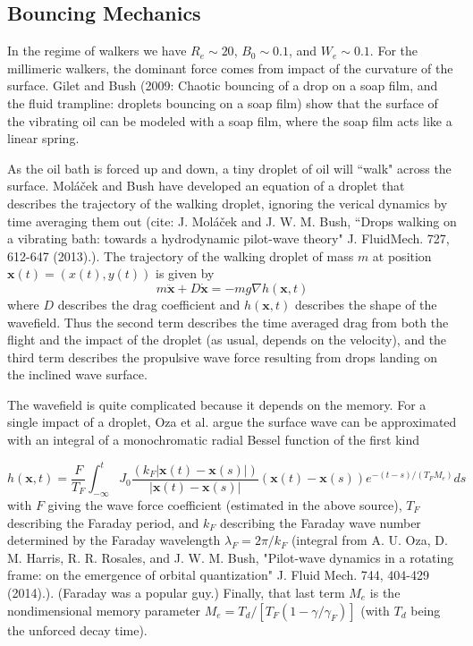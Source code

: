 \subsection{Bouncing Mechanics}
In the regime of walkers we have $R_e \sim 20$, $B_0 \sim 0.1$, and $W_e \sim 0.1$. For the millimeric walkers, the dominant force comes from impact of the curvature of the surface. Gilet and Bush (2009: Chaotic bouncing of a drop on a soap film, and the fluid trampline: droplets bouncing on a soap film) show that the surface of the vibrating oil can be modeled with a soap film, where the soap film acts like a linear spring. 

As the oil bath is forced up and down, a tiny droplet of oil will ``walk" across the surface. Mol\'{a}\v{c}ek and Bush have developed an equation of a droplet that describes the trajectory of the walking droplet, ignoring the verical dynamics by time averaging them out (cite: J. Mol\'{a}\v{c}ek and J. W. M. Bush, ``Drops walking on a vibrating bath: towards a hydrodynamic pilot-wave theory" J. FluidMech. 727, 612-647 (2013).). The trajectory of the walking droplet of mass $m$ at position $\textbf{x}(t) = (x(t),y(t))$ is given by
\begin{equation}
m \ddot{\textbf{x}} + D \dot{\textbf{x}} = -mg\nabla h(\textbf{x},t) 
\end{equation}
where $D$ describes the drag coefficient and $h(\textbf{x},t)$ describes the shape of the wavefield. Thus the second term describes the time averaged drag from both the flight and the impact of the droplet (as usual, depends on the velocity), and the third term describes the propulsive wave force resulting from drops landing on the inclined wave surface. 

The wavefield is quite complicated because it depends on the memory. For a single impact of a droplet, Oza et al. argue the surface wave can be approximated with an integral of a monochromatic radial Bessel function of the first kind

\begin{equation}
h(\textbf{x},t) = \frac{F}{T_F} \int_{-\infty}^{t} J_0 \frac{(k_F |\textbf{x}(t)-\textbf{x}(s)|)}{|\textbf{x}(t)-\textbf{x}(s)|} (\textbf{x}(t)-\textbf{x}(s))e^{-(t-s)/(T_F M_e)} ds
\end{equation}
with $F$ giving the wave force coefficient (estimated in the above source), $T_F$ describing the Faraday period, and $k_F$ describing the Faraday wave number determined by the Faraday wavelength $\lambda_F = 2π/k_F$ (integral from A. U. Oza, D. M. Harris, R. R. Rosales, and J. W. M. Bush, "Pilot-wave dynamics in a rotating frame: on the emergence of orbital quantization" J. Fluid Mech. 744, 404-429 (2014).). (Faraday was a popular guy.) Finally, that last term $M_e$ is the nondimensional memory parameter $M_e = T_d/[T_F(1-\gamma / \gamma_F)]$ (with $T_d$ being the unforced decay time).

